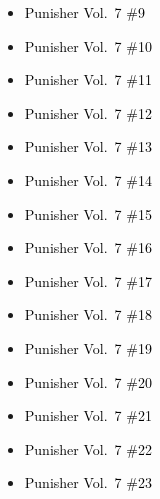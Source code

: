 \documentclass[12pt]{article}
\newcommand{\checkbox}{\raisebox{0.0ex}{\fbox{\rule{0ex}{1.5ex} \rule{1.5ex}{0ex}}}}
\begin{document}
\vspace{0.3cm}
\noindent
\begin{tcolorbox}[
  colback=white!95!gray,
  colframe=black,
  width=\textwidth,
  arc=4mm,
  auto outer arc,
  boxrule=0.8pt,
  left=8pt,right=8pt,top=8pt,bottom=8pt
]
\begin{itemize}[left=0pt,label={\checkbox}]
    \item \textcolor{black}{Punisher Vol.\ 7 \#9}
    \item \textcolor{black}{Punisher Vol.\ 7 \#10}
    \item \textcolor{black}{Punisher Vol.\ 7 \#11}
    \item \textcolor{black}{Punisher Vol.\ 7 \#12}
    \item \textcolor{black}{Punisher Vol.\ 7 \#13}
    \item \textcolor{black}{Punisher Vol.\ 7 \#14}
    \item \textcolor{black}{Punisher Vol.\ 7 \#15}
    \item \textcolor{black}{Punisher Vol.\ 7 \#16}
    \item \textcolor{black}{Punisher Vol.\ 7 \#17}
    \item \textcolor{black}{Punisher Vol.\ 7 \#18}
    \item \textcolor{black}{Punisher Vol.\ 7 \#19}
    \item \textcolor{black}{Punisher Vol.\ 7 \#20}
    \item \textcolor{black}{Punisher Vol.\ 7 \#21}
    \item \textcolor{black}{Punisher Vol.\ 7 \#22}
    \item \textcolor{black}{Punisher Vol.\ 7 \#23}
\end{itemize}
\end{tcolorbox}

\newpage
{}
\end{document}
